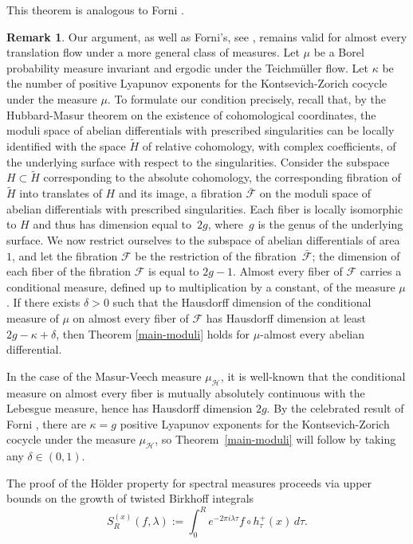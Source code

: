 \documentclass[JEP,XML,SOM,Unicode]{cedram}
\let\mathcal\mathscr
\theoremstyle{plain}
\theoremstyle{definition}
\newtheorem{remark}[theorem]{Remark}
\let\lam\lambda
\newcommand{\Fk}{\mathcal{F}}
\newcommand{\HH}{\mathcal{H}}
\begin{document}
This theorem is analogous to Forni \cite[Cor.\,1.7]{Forni2}.

\begin{remark} \label{remark-main}
Our argument, as well as Forni's, see \cite[Rem.\,1.9]{Forni2}, remains valid for almost every translation flow under a more general class of measures. Let $\mu$ be a Borel probability measure invariant and ergodic under the Teichmüller flow.
Let $\kappa$ be the number of positive Lyapunov exponents for the Kontsevich-Zorich cocycle under the measure $\mu$.
To formulate our condition precisely, recall that, by the Hubbard-Masur theorem on the existence of cohomological coordinates, the moduli space of abelian differentials with prescribed singularities can be locally identified with the space
${\widetilde H}$ of relative cohomology, with complex coefficients, of the underlying surface with respect to the singularities. Consider the subspace $H\subset {\widetilde H}$ corresponding to the absolute cohomology, the corresponding fibration of ${\widetilde H}$ into translates of $H$ and its image, a fibration $\bar{\Fk}$ on the moduli space of abelian differentials with prescribed singularities. Each fiber is locally isomorphic to $H$ and thus has dimension equal to~$2g$, where~$g$ is the genus of the underlying surface. We now restrict ourselves to the subspace of abelian differentials of area $1$, and let the fibration $\Fk$ be the restriction of the fibration~$\bar{\Fk}$; the dimension of each fiber of the fibration $\Fk$ is equal to $2g-1$. Almost every fiber of $\Fk$ carries a conditional measure, defined up to multiplication by a constant, of the measure $\mu$. If there exists
$\delta>0$ such that the Hausdorff dimension of the conditional measure of $\mu$ on almost every fiber of $\Fk$ has Hausdorff dimension at least $2g-\kappa+\delta$, then Theorem \ref{main-moduli} holds for $\mu$-almost every abelian differential.

In the case of the Masur-Veech measure $\mu_\HH$, it is well-known that the conditional measure on almost every fiber is mutually absolutely continuous with the Lebesgue measure, hence has Hausdorff dimension $2g$. By the celebrated result of Forni \cite{Forni}, there are $\kappa=g$ positive Lyapunov exponents for the Kontsevich-Zorich cocycle under the measure $\mu_\HH$, so
Theorem~\ref{main-moduli} will follow by taking any $\delta\in (0,1)$.
\end{remark}

The proof of the Hölder property for spectral measures proceeds via upper bounds on the growth of twisted Birkhoff integrals
\[
S_R^{(x)}(f,\lam) := \int_0^R e^{-2\pi i \lam \tau} f\circ h^+_\tau(x)\,d\tau.
\]
\end{document}
